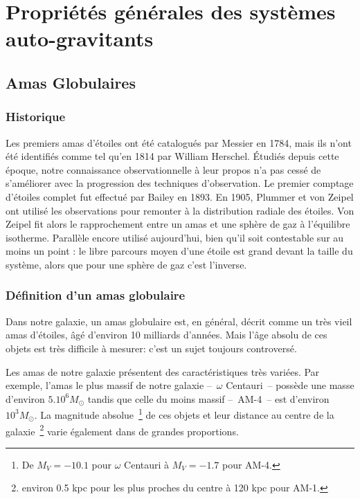 \normalsize

\chapter{Propriétés générales des systèmes auto-gravitants}


	\minitoc
	\section{Amas Globulaires}
		\subsection{Historique}
			Les premiers amas d'étoiles ont été catalogués par Messier en 1784,
			mais ils n'ont été identifiés comme tel qu'en 1814 par William
			Herschel. Étudiés depuis cette époque, notre connaissance
			observationnelle à leur propos n'a pas cessé de s'améliorer avec la progression
			des techniques d'observation. Le premier comptage d'étoiles complet fut
			effectué par Bailey en 1893. En 1905, Plummer et von
			Zeipel ont utilisé les observations pour remonter à la distribution radiale
			des étoiles. Von Zeipel fit alors le rapprochement entre un amas et
			une sphère de gaz à l'équilibre isotherme. Parallèle encore utilisé
			aujourd'hui, bien qu'il soit contestable sur au moins un point : le libre
			parcours moyen d'une étoile est grand devant la taille du système, alors que
			pour une sphère de gaz c'est l'inverse.

		\subsection{Définition d'un amas globulaire}
			Dans notre galaxie, un amas globulaire est, en général, décrit comme un
			très vieil amas d'étoiles, âgé d'environ 10 milliards d'années. Mais
			l'âge absolu de ces objets est très difficile à mesurer: c'est un sujet
			toujours controversé.

			Les amas de notre galaxie présentent des caractéristiques très variées. Par
			exemple, l'amas le plus massif de notre galaxie --~$\omega$ Centauri~--
			possède une masse d'environ $5.10^6 M_\odot$ tandis que celle du moins
			massif --~AM-4~-- est d'environ $10^3 M_\odot$. La magnitude
			absolue~\footnote{De $M_V = -10.1$ pour $\omega$ Centauri à $M_V = -1.7$
			pour AM-4.} de ces objets et leur distance au centre de la
			galaxie~\footnote{environ 0.5 kpc pour les plus proches du centre à 120 kpc
			pour AM-1.} varie également dans de grandes proportions.

